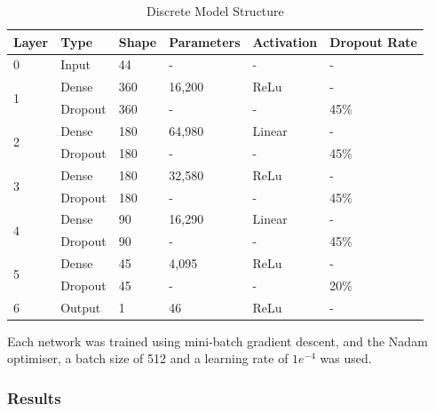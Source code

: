 \begin{table}[!h]
    \centering
    \caption{Discrete Model Structure}
    \begin{tabular}[b]{l l l l l l }
        \textbf{Layer} & \textbf{Type} & \textbf{Shape} & \textbf{Parameters} & \textbf{Activation} & \textbf{Dropout Rate} \\
        \hline
        0 & Input & 44 & - & - & - \\
        \hline
        \multirow[t]{2}{*}{1} & Dense & 360 & 16,200 & ReLu  & - \\ \cline{2-6}
        
                & Dropout & 360 & - & - & 45\% \\
        \hline
        \multirow[t]{2}{*}{2} & Dense & 180 & 64,980 & Linear  & - \\ \cline{2-6}
        
        & Dropout & 180 & - & - & 45\% \\
        \hline
        \multirow[t]{2}{*}{3} & Dense & 180 & 32,580 & ReLu  & - \\ \cline{2-6}
        
        & Dropout & 180 & - & - & 45\% \\
        \hline
        \multirow[t]{2}{*}{4} & Dense & 90 & 16,290 & Linear  & - \\ \cline{2-6}
        
        & Dropout & 90 & - & - & 45\% \\
        \hline
        \multirow[t]{2}{*}{5} & Dense & 45 & 4,095 & ReLu  & - \\ \cline{2-6}
        
        & Dropout & 45 & - & - & 20\% \\
        \hline
        6 & Output & 1 & 46 & ReLu & - \\
        \hline
    \end{tabular}
    \label{tab:discrete_model_struct}
\end{table}

Each network was trained using mini-batch gradient descent, and the Nadam optimiser, a batch size of 512 and a learning rate of $1e^{-4}$ was used.


\FloatBarrier
\subsubsection{Results}
 
